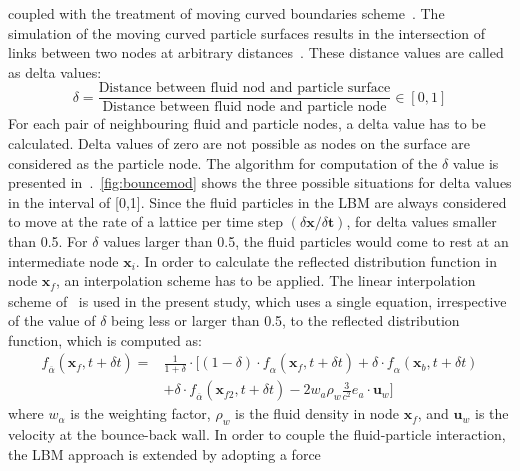 coupled with the treatment of moving curved boundaries scheme~\citep{Yu2003}. 
The simulation of the moving curved particle surfaces results in the 
intersection of links between two nodes at arbitrary 
distances~\citep{Iglberger2008}. These distance values are called as delta 
values:
%
\begin{equation}
\delta = \frac{\mbox{Distance between fluid nod and particle 
surface}}{\mbox{Distance between fluid node and particle node}} \in [0,1]
\end{equation} 
%
For each pair of neighbouring fluid and particle nodes, a delta value has to be 
calculated. Delta values of zero are not possible as nodes on the surface are 
considered as the particle node. The algorithm for computation of the $\delta$ 
value is presented in~\citet{Iglberger2008}.~\cref{fig:bouncemod} shows the 
three possible situations for delta values in the interval of [0,1]. Since the 
fluid particles in the LBM are always considered to move at the rate of a 
lattice per time step $(\delta \mathbf{x}/ \delta \mathbf{t})$, for delta 
values smaller than 0.5. For $\delta$ values larger than 0.5, the fluid 
particles would come to rest at an intermediate node $\mathbf{x}_{\mathit{i}}$. 
In order to calculate the reflected distribution function in node 
$\mathbf{x}_{\mathit{f}}$, an interpolation scheme has to be applied. The 
linear interpolation scheme of~\citet{Yu2003} is used in the present study, 
which uses a single equation, irrespective of the value of $\delta$ being less 
or larger than 0.5, to the reflected distribution function, which is computed 
as:
%
\begin{align}
 \nonumber
\mathit{\mathit{f}}_{\overline{\alpha}}(\mathbf{x}_{\mathit{f}},t + \delta t) = 
& \frac{1}{1 + \delta} \cdot [(1-\delta)\cdot 
\mathit{\mathit{f}}_{\alpha}(\mathbf{x}_{\mathit{f}},t + \delta t) + \delta 
\cdot \mathit{\mathit{f}}_{\alpha}(\mathbf{x}_{\mathit{b}},t + \delta t)  \\
& + \delta \cdot 
\mathit{\mathit{f}}_{\overline{\alpha}}(\mathbf{x}_{\mathit{f2}},t + \delta t) 
-2\mathit{w}_{\mathit{a}}\rho_{\mathit{w}}\frac{3}{\mathit{c}^{2}}\mathbf{\mathit{e}}_{\mathit{a}}\cdot
 \mathbf{u}_{\mathit{w}}]
\end{align}
%
where $\mathit{w}_{\alpha}$ is the weighting factor, $\rho_{\mathit{w}}$ is the 
fluid density in node $\mathbf{x}_{\mathit{f}}$, and $ \mathbf{u}_{\mathit{w}}  
$ is the velocity at the bounce-back wall. In order to couple the 
fluid-particle interaction, the LBM approach is extended by adopting a force 
